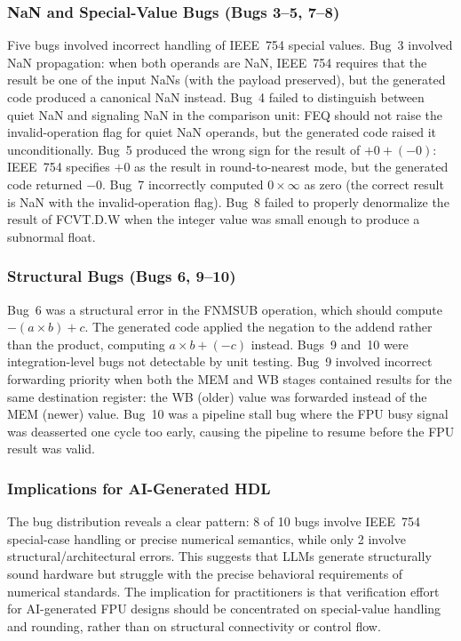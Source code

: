 \documentclass[journal]{IEEEtran}
\begin{document}
\subsubsection{NaN and Special-Value Bugs (Bugs 3--5, 7--8)}
Five bugs involved incorrect handling of IEEE~754 special values.
Bug~3 involved NaN propagation: when both operands are NaN, IEEE~754
requires that the result be one of the input NaNs (with the payload
preserved), but the generated code produced a canonical NaN instead.
Bug~4 failed to distinguish between quiet NaN and signaling NaN in the
comparison unit: FEQ should not raise the invalid-operation flag for
quiet NaN operands, but the generated code raised it unconditionally.
Bug~5 produced the wrong sign for the result of $+0 + (-0)$: IEEE~754
specifies $+0$ as the result in round-to-nearest mode, but the
generated code returned $-0$.  Bug~7 incorrectly computed $0 \times
\infty$ as zero (the correct result is NaN with the invalid-operation
flag).  Bug~8 failed to properly denormalize the result of
FCVT.D.W when the integer value was small enough to produce a subnormal
float.

\subsubsection{Structural Bugs (Bugs 6, 9--10)}
Bug~6 was a structural error in the FNMSUB operation, which should
compute $-(a \times b) + c$.  The generated code applied the negation to
the addend rather than the product, computing $a \times b + (-c)$
instead.  Bugs~9 and~10 were integration-level bugs not detectable by
unit testing.  Bug~9 involved incorrect forwarding priority when both
the MEM and WB stages contained results for the same destination
register: the WB (older) value was forwarded instead of the MEM (newer)
value.  Bug~10 was a pipeline stall bug where the FPU busy signal was
deasserted one cycle too early, causing the pipeline to resume before
the FPU result was valid.

\subsubsection{Implications for AI-Generated HDL}
The bug distribution reveals a clear pattern: 8 of 10 bugs involve
IEEE~754 special-case handling or precise numerical semantics, while
only 2 involve structural/architectural errors.  This suggests that
LLMs generate structurally sound hardware but struggle with the precise
behavioral requirements of numerical standards.  The implication for
practitioners is that verification effort for AI-generated FPU designs
should be concentrated on special-value handling and rounding, rather
than on structural connectivity or control flow.
\end{document}
